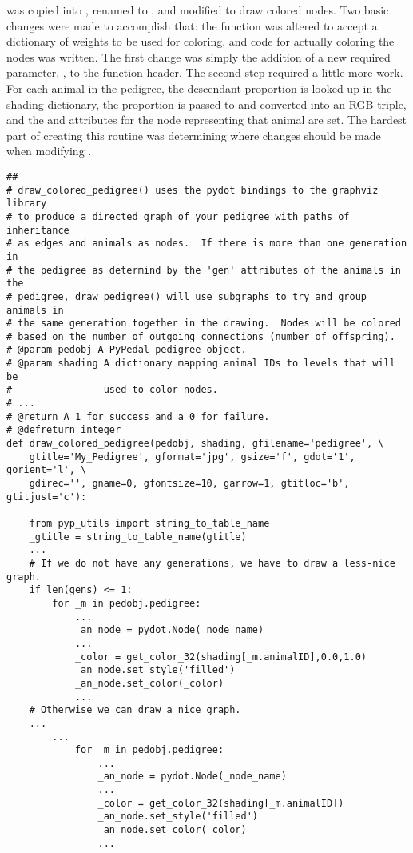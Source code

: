  was copied into , renamed to , and modified to draw colored nodes.  Two basic changes were made to accomplish that: the function was altered to accept a dictionary of weights to be used for coloring, and code for actually coloring the nodes was written.  The first change was simply the addition of a new required parameter, , to the function header.  The second step required a little more work.  For each animal in the pedigree, the descendant proportion is looked-up in the shading dictionary, the proportion is passed to  and converted into an RGB triple, and the  and  attributes for the node representing that animal are set.  The hardest part of creating this routine was determining where changes should be made when modifying .
\begin{verbatim}
##
# draw_colored_pedigree() uses the pydot bindings to the graphviz library
# to produce a directed graph of your pedigree with paths of inheritance
# as edges and animals as nodes.  If there is more than one generation in
# the pedigree as determind by the 'gen' attributes of the animals in the
# pedigree, draw_pedigree() will use subgraphs to try and group animals in
# the same generation together in the drawing.  Nodes will be colored
# based on the number of outgoing connections (number of offspring).
# @param pedobj A PyPedal pedigree object.
# @param shading A dictionary mapping animal IDs to levels that will be
#                used to color nodes.
# ...
# @return A 1 for success and a 0 for failure.
# @defreturn integer
def draw_colored_pedigree(pedobj, shading, gfilename='pedigree', \
    gtitle='My_Pedigree', gformat='jpg', gsize='f', gdot='1', gorient='l', \
    gdirec='', gname=0, gfontsize=10, garrow=1, gtitloc='b', gtitjust='c'):

    from pyp_utils import string_to_table_name
    _gtitle = string_to_table_name(gtitle)
    ...
    # If we do not have any generations, we have to draw a less-nice graph.
    if len(gens) <= 1:
        for _m in pedobj.pedigree:
            ...
            _an_node = pydot.Node(_node_name)
            ...
            _color = get_color_32(shading[_m.animalID],0.0,1.0)
            _an_node.set_style('filled')
            _an_node.set_color(_color)
            ...
    # Otherwise we can draw a nice graph.
    ...
        ...
            for _m in pedobj.pedigree:
                ...
                _an_node = pydot.Node(_node_name)
                ...
                _color = get_color_32(shading[_m.animalID])
                _an_node.set_style('filled')
                _an_node.set_color(_color)
                ...
\end{verbatim}

